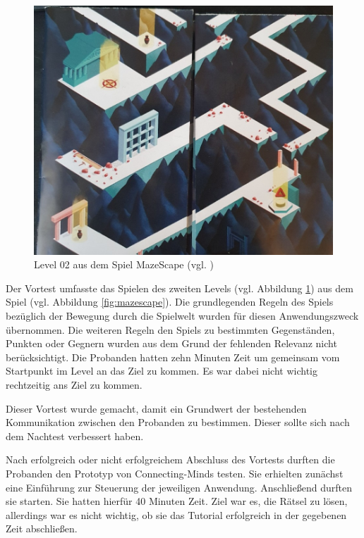 \begin{figure}[ht]
\centering
\includegraphics[width=1\linewidth]{content/pictures/MazeScape_Level02.jpg}
\caption{Level 02 aus dem Spiel MazeScape (vgl. \cite{noauthor_mazescape_nodate})}
\label{fig:mazescape_level-02}
\end{figure}

Der Vortest umfasste das Spielen des zweiten Levels (vgl. Abbildung \ref{fig:mazescape_level-02}) aus dem Spiel  (vgl. Abbildung \ref{fig:mazescape}). Die grundlegenden Regeln des Spiels bezüglich der Bewegung durch die Spielwelt wurden für diesen Anwendungszweck übernommen. Die weiteren Regeln den Spiels zu bestimmten Gegenständen, Punkten oder Gegnern wurden aus dem Grund der fehlenden Relevanz nicht berücksichtigt. Die Probanden hatten zehn Minuten Zeit um gemeinsam vom Startpunkt im Level an das Ziel zu kommen. Es war dabei nicht wichtig rechtzeitig ans Ziel zu kommen.

Dieser Vortest wurde gemacht, damit ein Grundwert der bestehenden Kommunikation zwischen den Probanden zu bestimmen. Dieser sollte sich nach dem Nachtest verbessert haben.

Nach erfolgreich oder nicht erfolgreichem Abschluss des Vortests durften die Probanden den Prototyp von Connecting-Minds testen. Sie erhielten zunächst eine Einführung zur Steuerung der jeweiligen Anwendung. Anschließend durften sie starten. Sie hatten hierfür 40 Minuten Zeit. Ziel war es, die Rätsel zu lösen, allerdings war es nicht wichtig, ob sie das Tutorial erfolgreich in der gegebenen Zeit abschließen.


